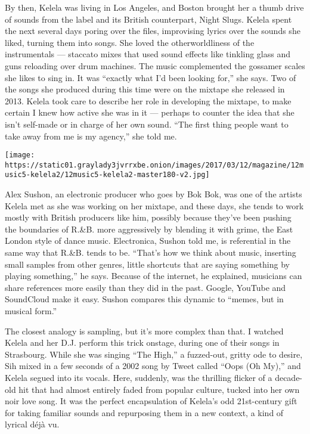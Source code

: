 By then, Kelela was living in Los Angeles, and Boston brought her a
thumb drive of sounds from the label and its British counterpart, Night
Slugs. Kelela spent the next several days poring over the files,
improvising lyrics over the sounds she liked, turning them into songs.
She loved the otherworldliness of the instrumentals --- staccato mixes
that used sound effects like tinkling glass and guns reloading over drum
machines. The music complemented the gossamer scales she likes to sing
in. It was ``exactly what I'd been looking for,'' she says. Two of the
songs she produced during this time were on the mixtape she released in
2013. Kelela took care to describe her role in developing the mixtape,
to make certain I knew how active she was in it --- perhaps to counter
the idea that she isn't self-made or in charge of her own sound. ``The
first thing people want to take away from me is my agency,'' she told
me.

\texttt{[image: https://static01.graylady3jvrrxbe.onion/images/2017/03/12/magazine/12music5-kelela2/12music5-kelela2-master180-v2.jpg]}

Alex Sushon, an electronic producer who goes by Bok Bok, was one of the
artists Kelela met as she was working on her mixtape, and these days,
she tends to work mostly with British producers like him, possibly
because they've been pushing the boundaries of R.\&B. more aggressively
by blending it with grime, the East London style of dance music.
Electronica, Sushon told me, is referential in the same way that R.\&B.
tends to be. ``That's how we think about music, inserting small samples
from other genres, little shortcuts that are saying something by playing
something,'' he says. Because of the internet, he explained, musicians
can share references more easily than they did in the past. Google,
YouTube and SoundCloud make it easy. Sushon compares this dynamic to
``memes, but in musical form.''

The closest analogy is sampling, but it's more complex than that. I
watched Kelela and her D.J. perform this trick onstage, during one of
their songs in Strasbourg. While she was singing ``The High,'' a
fuzzed-out, gritty ode to desire, Sih mixed in a few seconds of a 2002
song by Tweet called ``Oops (Oh My),'' and Kelela segued into its
vocals. Here, suddenly, was the thrilling flicker of a decade-old hit
that had almost entirely faded from popular culture, tucked into her own
noir love song. It was the perfect encapsulation of Kelela's odd
21st-century gift for taking familiar sounds and repurposing them in a
new context, a kind of lyrical déjà vu.

